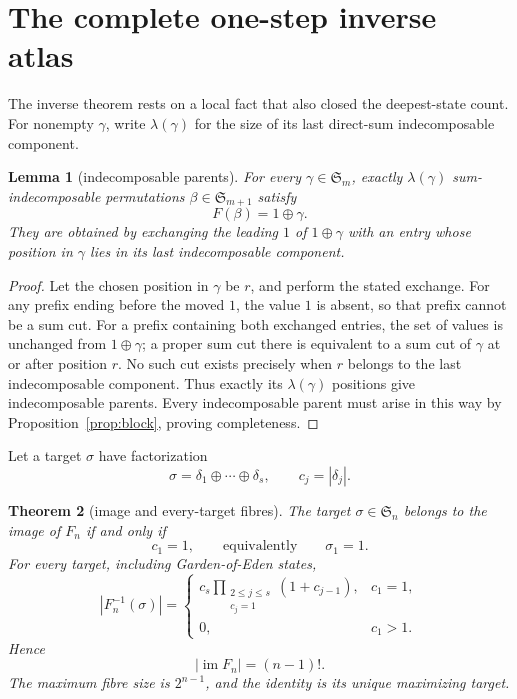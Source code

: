 \documentclass[a4paper,10pt]{amsart}
\newtheorem{theorem}{Theorem}[section]
\newtheorem{lemma}[theorem]{Lemma}
\theoremstyle{definition}
\theoremstyle{remark}
\newcommand{\Sn}{\mathfrak S_n}
\newcommand{\im}{\operatorname{im}}
\begin{document}
\section{The complete one-step inverse atlas}

The inverse theorem rests on a local fact that also closed the deepest-state
count.  For nonempty $\gamma$, write $\lambda(\gamma)$ for the size of its
last direct-sum indecomposable component.

\begin{lemma}[indecomposable parents]\label{lem:core-fibre}
For every $\gamma\in\mathfrak S_m$, exactly $\lambda(\gamma)$
sum-indecomposable permutations $\beta\in\mathfrak S_{m+1}$ satisfy
\[
                              F(\beta)=1\oplus\gamma.
\]
They are obtained by exchanging the leading $1$ of $1\oplus\gamma$ with an
entry whose position in $\gamma$ lies in its last indecomposable component.
\end{lemma}

\begin{proof}
Let the chosen position in $\gamma$ be $r$, and perform the stated exchange.
For any prefix ending before the moved $1$, the value $1$ is absent, so that
prefix cannot be a sum cut.  For a prefix containing both exchanged entries,
the set of values is unchanged from $1\oplus\gamma$; a proper sum cut there
is equivalent to a sum cut of $\gamma$ at or after position $r$.  No such cut
exists precisely when $r$ belongs to the last indecomposable component.
Thus exactly its $\lambda(\gamma)$ positions give indecomposable parents.
Every indecomposable parent must arise in this way by
Proposition~\ref{prop:block}, proving completeness.
\end{proof}

Let a target $\sigma$ have factorization
\[
                \sigma=\delta_1\oplus\cdots\oplus\delta_s,
                \qquad c_j=|\delta_j|.
\]

\begin{theorem}[image and every-target fibres]\label{thm:fibre}
The target $\sigma\in\Sn$ belongs to the image of $F_n$ if and only if
\[
                          c_1=1,
 \qquad\text{equivalently}\qquad \sigma_1=1.
\]
For every target, including Garden-of-Eden states,
\begin{equation}\label{eq:fibre-product}
 |F_n^{-1}(\sigma)|=
 \begin{cases}
 c_s\displaystyle\prod_{\substack{2\le j\le s\\c_j=1}}
        (1+c_{j-1}),&c_1=1,\\[3mm]
 0,&c_1>1.
 \end{cases}
\end{equation}
Hence
\begin{equation}\label{eq:image-size}
                         |\im F_n|=(n-1)!.
\end{equation}
The maximum fibre size is $2^{n-1}$, and the identity is its unique
maximizing target.
\end{theorem}
\end{document}
